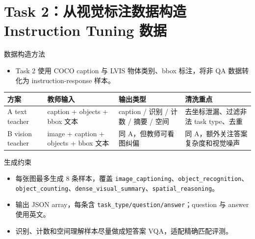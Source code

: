 \documentclass{beamer}
\newcommand{\smalltab}{\scriptsize}
\begin{document}
\section{Task 2：从视觉标注数据构造 Instruction Tuning 数据}

\begin{frame}[shrink=5]{数据构造方法}
\small
\begin{itemize}
\item Task 2 使用 COCO caption 与 LVIS 物体类别、bbox 标注，将非 QA 数据转化为 instruction-response 样本。
\end{itemize}
\smalltab
\begin{tabular}{p{}p{}p{}p{}}
\toprule
方案 & 教师输入 & 输出类型 & 清洗重点 \\
\midrule
A text teacher & caption + objects + bbox 文本 & caption / 识别 / 计数 / 摘要 / 空间 & 去坐标泄漏、过滤非法 task type、去重 \\
B vision teacher & image + caption + objects + bbox 文本 & 同 A，但教师可看图纠偏 & 同 A，额外关注答案复杂度和视觉噪声 \\
\bottomrule
\end{tabular}
\vspace{0.4em}
\begin{block}{生成约束}
\begin{itemize}
\item 每张图最多生成 8 条样本，覆盖 \texttt{image\_captioning}、\texttt{object\_recognition}、\texttt{object\_counting}、\texttt{dense\_visual\_summary}、\texttt{spatial\_reasoning}。
\item 输出 JSON array，每条含 \texttt{task\_type/question/answer}；question 与 answer 使用英文。
\item 识别、计数和空间理解样本尽量做成短答案 VQA，适配精确匹配评测。
\end{itemize}
\end{block}
\end{frame}
\end{document}
